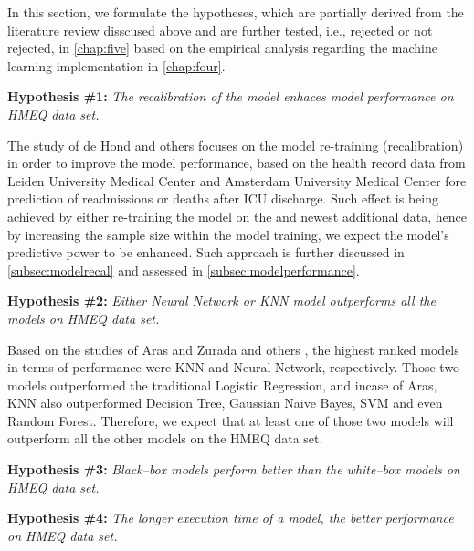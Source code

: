 In this section, we formulate the hypotheses, which are partially derived from the literature review disscused above and are further tested, i.e., rejected or not rejected, in \autoref{chap:five} based on the empirical analysis regarding the machine learning implementation in \autoref{chap:four}.
\vspace{0.3cm}

\noindent \textbf{Hypothesis \#1:} \textit{The recalibration of the model enhaces model performance on HMEQ data set.}

The study of de Hond and others \citep{de2023predicting} focuses on the model re-training (recalibration) in order to improve the model performance, based on the health record data from Leiden University Medical Center and Amsterdam University Medical Center fore prediction of readmissions or deaths after ICU discharge.
Such effect is being achieved by either re-training the model on the and newest additional data, hence by increasing the sample size within the model training, we expect the model's predictive power to be enhanced. Such approach is further discussed in \autoref{subsec:modelrecal} and assessed in \autoref{subsec:modelperformance}.
\vspace{0.3cm}


\noindent \textbf{Hypothesis \#2:} \textit{Either Neural Network or KNN model outperforms all the models on HMEQ data set.}

Based on the studies of Aras \citep{serkan2021bagging} and Zurada and others \citep{zurada2014classification}, the highest ranked models in terms of performance were KNN and Neural Network, respectively. Those two models outperformed the traditional Logistic Regression, and incase of Aras, KNN also outperformed Decision Tree, Gaussian Naive Bayes, SVM and even Random Forest.
Therefore, we expect that at least one of those two models will outperform all the other models on the HMEQ data set.

\vspace{0.3cm}

\noindent \textbf{Hypothesis \#3:} \textit{Black--box models perform better than the white--box models on HMEQ data set.}

\citep{loyola2019black}


\vspace{0.3cm}


\noindent \textbf{Hypothesis \#4:} \textit{The longer execution time of a model, the better performance on HMEQ data set.}


